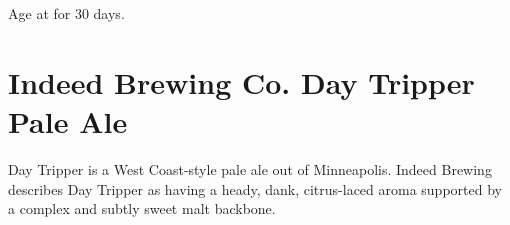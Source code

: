 \documentclass[10pt,oneside]{scrbook}
\begin{document}

\begin{methodandtiming}
 
\begin{mashsteps}
\end{mashsteps}

\begin{fermentationsteps}
\end{fermentationsteps}

\begin{directions}
Age at  for 30 days.
\end{directions}

\end{methodandtiming}

\pagebreak

\begin{ingredientsblock}

\begin{malts}
\end{malts}

\begin{hops}

\end{hops}

\begin{yeasts}
\end{yeasts}

\end{ingredientsblock}

\chapter*{Indeed Brewing Co. Day Tripper Pale Ale}

\begin{aboutblock}
Day Tripper is a West Coast-style pale ale out of Minneapolis. Indeed Brewing describes Day
Tripper as having a heady, dank, citrus-laced aroma supported by a complex and subtly sweet
malt backbone.
\end{aboutblock}
\end{document}

